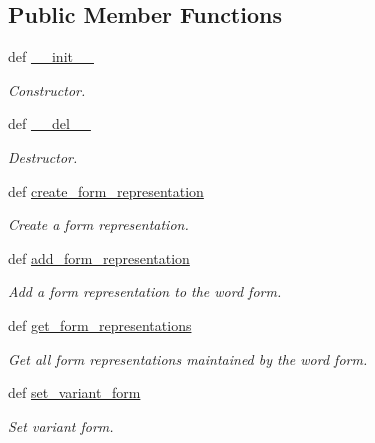 \subsection*{Public Member Functions}
\begin{DoxyCompactItemize}
\item 
def \hyperlink{classlmf_1_1src_1_1morphology_1_1word__form_1_1_word_form_afcc4ec0d271e48a7f35920a1e91aa9b9}{\+\_\+\+\_\+init\+\_\+\+\_\+}
\begin{DoxyCompactList}\small\item\em Constructor. \end{DoxyCompactList}\item 
def \hyperlink{classlmf_1_1src_1_1morphology_1_1word__form_1_1_word_form_aa7b79f6c8c3bd98e57b7d2bc60a9b88c}{\+\_\+\+\_\+del\+\_\+\+\_\+}
\begin{DoxyCompactList}\small\item\em Destructor. \end{DoxyCompactList}\item 
def \hyperlink{classlmf_1_1src_1_1morphology_1_1word__form_1_1_word_form_a35cc3cb1ceda558386c81cf88374b96b}{create\+\_\+form\+\_\+representation}
\begin{DoxyCompactList}\small\item\em Create a form representation. \end{DoxyCompactList}\item 
def \hyperlink{classlmf_1_1src_1_1morphology_1_1word__form_1_1_word_form_a9074b17bb3d1ebcd32b5c8b8fbc3eeda}{add\+\_\+form\+\_\+representation}
\begin{DoxyCompactList}\small\item\em Add a form representation to the word form. \end{DoxyCompactList}\item 
def \hyperlink{classlmf_1_1src_1_1morphology_1_1word__form_1_1_word_form_af5ca5e6fdf8232fb5354b2d5e520f372}{get\+\_\+form\+\_\+representations}
\begin{DoxyCompactList}\small\item\em Get all form representations maintained by the word form. \end{DoxyCompactList}\item 
def \hyperlink{classlmf_1_1src_1_1morphology_1_1word__form_1_1_word_form_aa4010d675af6deb25bf95e7aa54c3f15}{set\+\_\+variant\+\_\+form}
\begin{DoxyCompactList}\small\item\em Set variant form. \end{DoxyCompactList}\item 

\end{DoxyCompactItemize}
